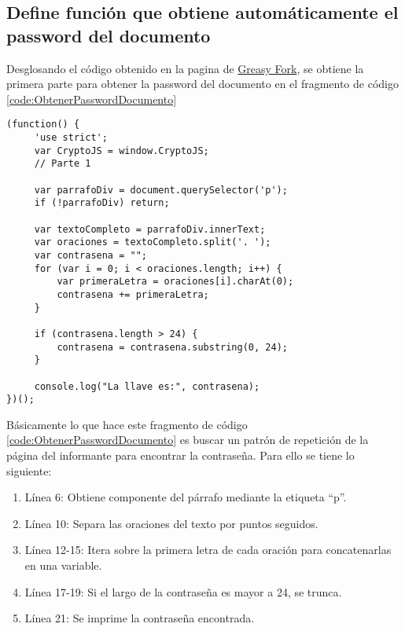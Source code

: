 \documentclass[letter,12pt]{article}
\newcounter{codecount}
\begin{document}
\clearpage

\subsection{Define función que obtiene automáticamente el password del documento}

Desglosando el código obtenido en la pagina de \href{https://greasyfork.org/es/scripts/479454-cryptojs/code}{Greasy Fork}, se obtiene la primera parte para obtener la password del documento en el fragmento de código \ref{code:ObtenerPasswordDocumento} 

\label{code:ObtenerPasswordDocumento}
\begin{lstlisting}[caption= Función para obtener la password del documento , label=lst:javascript_example]
    (function() {
     'use strict';
     var CryptoJS = window.CryptoJS;
     // Parte 1

     var parrafoDiv = document.querySelector('p');
     if (!parrafoDiv) return;

     var textoCompleto = parrafoDiv.innerText;
     var oraciones = textoCompleto.split('. ');
     var contrasena = "";
     for (var i = 0; i < oraciones.length; i++) {
         var primeraLetra = oraciones[i].charAt(0);
         contrasena += primeraLetra;
     }

     if (contrasena.length > 24) {
         contrasena = contrasena.substring(0, 24);
     }

     console.log("La llave es:", contrasena);
})();

\end{lstlisting}

Básicamente lo que hace este fragmento de código \ref{code:ObtenerPasswordDocumento} es buscar un patrón de repetición de la página del informante para encontrar la contraseña. Para ello se tiene lo siguiente:

\begin{enumerate}
    \item Línea 6: Obtiene componente del párrafo mediante la etiqueta ``p''.

    \item Línea 10: Separa las oraciones del texto por puntos seguidos.

    \item Línea 12-15: Itera sobre la primera letra de cada oración para concatenarlas en una variable.

    \item Línea 17-19: Si el largo de la contraseña es mayor a 24, se trunca.

    \item Línea 21: Se imprime la contraseña encontrada.
\end{enumerate}
\end{document}
